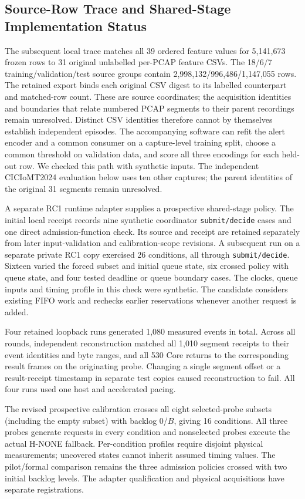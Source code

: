 \documentclass[10pt,onecolumn]{IEEEtran}
\begin{document}
\subsection{Source-Row Trace and Shared-Stage Implementation Status}
\label{sec:source_row_stage}
The subsequent local trace matches all 39 ordered feature values for
5,141,673 frozen rows to 31 original unlabelled per-PCAP feature CSVs.
The 18/6/7 training/validation/test source groups contain
2,998,132/996,486/1,147,055 rows. The retained export binds each original
CSV digest to its labelled counterpart and matched-row count. These are
source coordinates; the acquisition identities and boundaries that relate
numbered PCAP segments to their parent recordings remain unresolved.
Distinct CSV identities therefore cannot by themselves establish independent
episodes. The accompanying software can refit the alert encoder and a
common consumer on a capture-level training split, choose a common threshold
on validation data, and score all three encodings for each held-out row.
We checked this path with synthetic inputs. The independent CICIoMT2024 evaluation below uses ten other captures; the parent identities of the original 31 segments remain unresolved.

A separate RC1 runtime adapter supplies a prospective shared-stage policy.
The initial local receipt records nine synthetic coordinator
\texttt{submit/decide} cases and one direct admission-function check.
Its source and receipt are retained separately from later input-validation
and calibration-scope revisions. A subsequent run on a separate private RC1 copy exercised 26 conditions,
all through \texttt{submit/decide}. Sixteen varied the forced subset and
initial queue state, six crossed policy with queue state, and four tested
deadline or queue boundary cases. The clocks, queue inputs and timing profile
in this check were synthetic. The candidate considers existing FIFO work and
rechecks earlier reservations whenever another request is added.

Four retained loopback runs generated 1,080 measured events in total.
Across all rounds, independent reconstruction matched all 1,010 segment
receipts to their event identities and byte ranges, and all 530 Core
returns to the corresponding result frames on the originating probe.
Changing a single segment offset or a result-receipt timestamp in separate
test copies caused reconstruction to fail. All four runs used one host
and accelerated pacing.

The revised prospective calibration crosses all eight selected-probe subsets
(including the empty subset) with backlog 0/$B$, giving 16 conditions.
All three probes generate requests in every condition and nonselected probes
execute the actual H-NONE fallback. Per-condition profiles require disjoint
physical measurements; uncovered states cannot inherit assumed timing values.
The pilot/formal comparison remains the three admission policies crossed
with two initial backlog levels. The adapter qualification and physical acquisitions have separate registrations.
\end{document}
